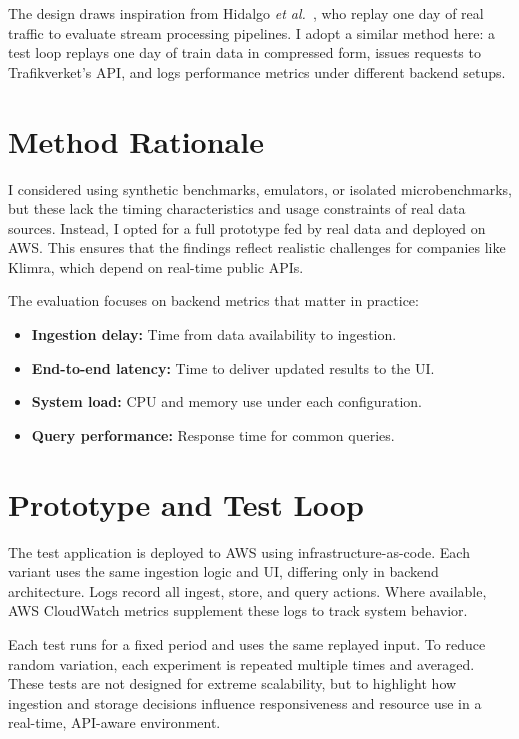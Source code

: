 \documentclass[nomenclature, english, biblatex]{kththesis}
\numberwithin{listing}{chapter}
\begin{document}
The design draws inspiration from Hidalgo \textit{et al.}~\cite{Hidalgo2023StreamProcMicroservices}, who replay one day of real traffic to evaluate stream processing pipelines. I adopt a similar method here: a test loop replays one day of train data in compressed form, issues requests to Trafikverket’s API, and logs performance metrics under different backend setups.

\section{Method Rationale}
\label{sec:dataCollection}

I considered using synthetic benchmarks, emulators, or isolated microbenchmarks, but these lack the timing characteristics and usage constraints of real data sources. Instead, I opted for a full prototype fed by real data and deployed on AWS. This ensures that the findings reflect realistic challenges for companies like Klimra, which depend on real-time public APIs.

The evaluation focuses on backend metrics that matter in practice:
\begin{itemize}
  \item \textbf{Ingestion delay:} Time from data availability to ingestion.
  \item \textbf{End-to-end latency:} Time to deliver updated results to the UI.
  \item \textbf{System load:} CPU and memory use under each configuration.
  \item \textbf{Query performance:} Response time for common queries.
\end{itemize}

\section{Prototype and Test Loop}
\label{sec:experimentalDesign}

The test application is deployed to AWS using infrastructure-as-code. Each variant uses the same ingestion logic and UI, differing only in backend architecture. Logs record all ingest, store, and query actions. Where available, AWS CloudWatch metrics supplement these logs to track system behavior.

Each test runs for a fixed period and uses the same replayed input. To reduce random variation, each experiment is repeated multiple times and averaged. These tests are not designed for extreme scalability, but to highlight how ingestion and storage decisions influence responsiveness and resource use in a real-time, API-aware environment.
\end{document}
